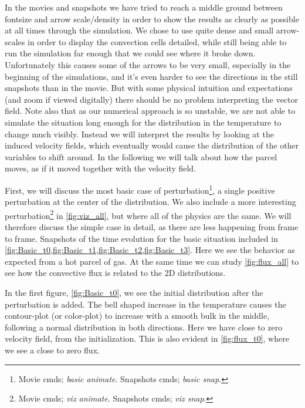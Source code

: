 \documentclass[11pt,a4paper,twocolumn,titlepage]{article}
\begin{document}
In the movies and snapshots we have tried to reach a middle ground between fontsize and arrow scale/density in order to show the results as clearly as possible at all times through the simulation. We chose to use quite dense and small arrow-scales in order to display the convection cells detailed, while still being able to run the simulation far enough that we could see where it broke down. Unfortunately this causes some of the arrows to be very small, especially in the beginning of the simulations, and it's even harder to see the directions in the still snapshots than in the movie. But with some physical intuition and expectations (and zoom if viewed digitally) there should be no problem interpreting the vector field. Note also that as our numerical approach is so unstable, we are not able to simulate the situation long enough for the distribution in the temperature to change much visibly. Instead we will interpret the results by looking at the induced velocity fields, which eventually would cause the distribution of the other variables to shift around. In the following we will talk about how the parcel moves, as if it moved together with the velocity field.

First, we will discuss the most basic case of perturbation\footnote{Movie cmds; \textit{basic animate}. Snapshots cmds; \textit{basic snap}.}, a single positive perturbation at the center of the distribution. We also include a more interesting perturbation\footnote{Movie cmds; \textit{viz animate}. Snapshots cmds; \textit{viz snap}.} in \cref{fig:viz_all}, but where all of the physics are the same. We will therefore discuss the simple case in detail, as there are less happening from frame to frame. Snapshots of the time evolution for the basic situation included in \cref{fig:Basic_t0,fig:Basic_t1,fig:Basic_t2,fig:Basic_t3}. Here we see the behavior as expected from a hot parcel of gas. At the same time we can study \cref{fig:flux_all} to see how the convective flux is related to the 2D distributions.

In the first figure, \ref{fig:Basic_t0}, we see the initial distribution after the perturbation is added. The bell shaped increase in the temperature causes the contour-plot (or color-plot) to increase with a smooth bulk in the middle, following a normal distribution in both directions. Here we have close to zero velocity field, from the initialization. This is also evident in \cref{fig:flux_t0}, where we see a close to zero flux.
\end{document}

